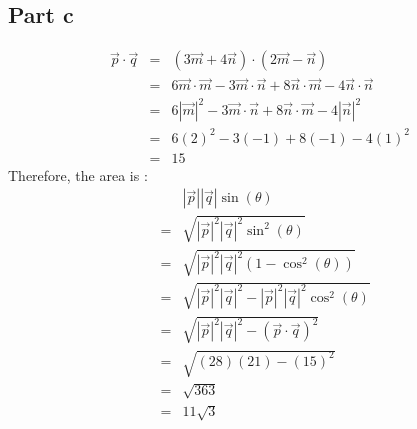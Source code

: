 \subsection*{Part c}
\begin{eqnarray*}
  \overrightarrow{p} \cdot \overrightarrow{q} &=& (3\overrightarrow{m} + 4\overrightarrow{n}) \cdot (2\overrightarrow{m} - \overrightarrow{n}) \\
  &=& 6\overrightarrow{m} \cdot \overrightarrow{m} - 3\overrightarrow{m} \cdot \overrightarrow{n} + 8\overrightarrow{n} \cdot \overrightarrow{m} - 4\overrightarrow{n} \cdot \overrightarrow{n} \\
  &=& 6|\overrightarrow{m}|^2 - 3\overrightarrow{m} \cdot \overrightarrow{n} + 8\overrightarrow{n} \cdot \overrightarrow{m} - 4|\overrightarrow{n}|^2 \\
  &=& 6(2)^2 - 3(-1) + 8(-1) - 4(1)^2 \\
  &=& 15
\end{eqnarray*}
Therefore, the area is :
\begin{eqnarray*}
  & & |\overrightarrow{p}| |\overrightarrow{q}| \sin(\theta) \\
  &=& \sqrt{|\overrightarrow{p}|^2 |\overrightarrow{q}|^2 \sin^2(\theta)} \\
  &=& \sqrt{|\overrightarrow{p}|^2 |\overrightarrow{q}|^2 (1-\cos^2(\theta))} \\
  &=& \sqrt{|\overrightarrow{p}|^2 |\overrightarrow{q}|^2 - |\overrightarrow{p}|^2 |\overrightarrow{q}|^2\cos^2(\theta)} \\
  &=& \sqrt{|\overrightarrow{p}|^2 |\overrightarrow{q}|^2 - (\overrightarrow{p} \cdot \overrightarrow{q})^2} \\
  &=& \sqrt{(28) (21) - (15)^2} \\
  &=& \sqrt{363} \\
  &=& 11 \sqrt{3}
\end{eqnarray*}